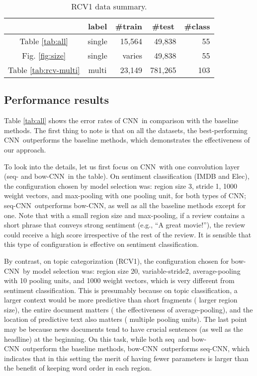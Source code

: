 \documentclass[11pt,letterpaper]{article}
\newcommand{\cnn}{CNN}
\newcommand{\scnnpfx}{seq}
\newcommand{\scnn}{seq-CNN}
\newcommand{\bcnn}{bow-CNN}
\newcommand{\Elec}{Elec}
\begin{document}
\begin{table}
\begin{center}
\begin{footnotesize}
\begin{tabular}{|c|c|r|r|r|} 
\hline
   & label          &\multicolumn{1}{|c|}{\#train}&\multicolumn{1}{|c|}{\#test}& \#class \\
\hline
Table \ref{tab:all}  & single  & 15,564 & 49,838 & 55 \\\hline
Fig. \ref{fig:size}  & single  & varies &  49,838 & 55 \\\hline                                                                
Table \ref{tab:rcv-multi}   & multi   & 23,149 & 781,265 & 103 \\
\hline
\end{tabular}
\end{footnotesize}
\vspace{-0.1in}
\caption{ \label{tab:rcv-data} \small 
RCV1 data summary.  
}
\end{center}
\end{table}


\subsection{Performance results}
Table \ref{tab:all} shows the error rates of \cnn\ in comparison with 
the baseline methods. The first thing to note is that on all the datasets, 
the best-performing \cnn\ outperforms the baseline methods, 
which demonstrates the effectiveness of our approach.  
  
To look into the details, 
let us first focus on \cnn\ with one convolution layer 
(\scnnpfx- and \bcnn\ in the table).  
On sentiment classification (IMDB and \Elec), 
the configuration chosen by model selection was: region size 3, stride 1, 1000 weight vectors, and max-pooling 
with one pooling unit, for both types of \cnn; 
\scnn\ outperforms \bcnn, as well as all the baseline methods except for one.  
Note that with a small region size and max-pooling, 
if a review contains a short phrase that conveys strong sentiment 
(e.g., ``A great movie!''), the review could receive a high score irrespective of the rest of the review. 
It is sensible that this type of configuration is effective on sentiment classification.  

By contrast, on topic categorization (RCV1), 
the configuration chosen for \bcnn\ by model selection was: region size 20, variable-stride2, 
average-pooling with 10 pooling units, and 1000 weight vectors, 
which is very different from sentiment classification.  
This is presumably because 
on topic classification, a larger context would be more predictive 
than short fragments ( larger region size), 
the entire document matters ( the effectiveness of average-pooling), 
and the location of predictive text also matters ( multiple pooling units). 
The last point may be because news documents tend to have crucial sentences 
(as well as the headline) at the beginning.  
On this task, while both \scnnpfx\ and \bcnn\ outperform the baseline methods, \bcnn\ outperforms \scnn,  
which indicates that in this setting 
the merit of having fewer parameters is larger than the benefit of keeping word order 
in each region.  
 
\end{document}
